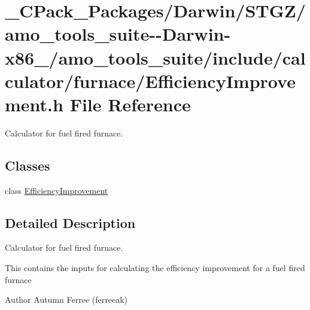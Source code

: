 \hypertarget{___c_pack___packages_2_darwin_2_s_t_g_z_2amo__tools__suite--_darwin-x86__64_2amo__tools__suite_26e7520aa6e88764b15ca5320d25b7632}{}\section{\+\_\+\+C\+Pack\+\_\+\+Packages/\+Darwin/\+S\+T\+G\+Z/amo\+\_\+tools\+\_\+suite-\/-\/\+Darwin-\/x86\+\_/amo\+\_\+tools\+\_\+suite/include/calculator/furnace/\+Efficiency\+Improvement.h File Reference}
\label{___c_pack___packages_2_darwin_2_s_t_g_z_2amo__tools__suite--_darwin-x86__64_2amo__tools__suite_26e7520aa6e88764b15ca5320d25b7632}


Calculator for fuel fired furnace.  


\subsection*{Classes}
\begin{DoxyCompactItemize}
\item 
class \hyperlink{class_efficiency_improvement}{Efficiency\+Improvement}
\end{DoxyCompactItemize}


\subsection{Detailed Description}
Calculator for fuel fired furnace. 

This contains the inputs for calculating the efficiency improvement for a fuel fired furnace

\begin{DoxyAuthor}{Author}
Autumn Ferree (ferreeak) 
\end{DoxyAuthor}
